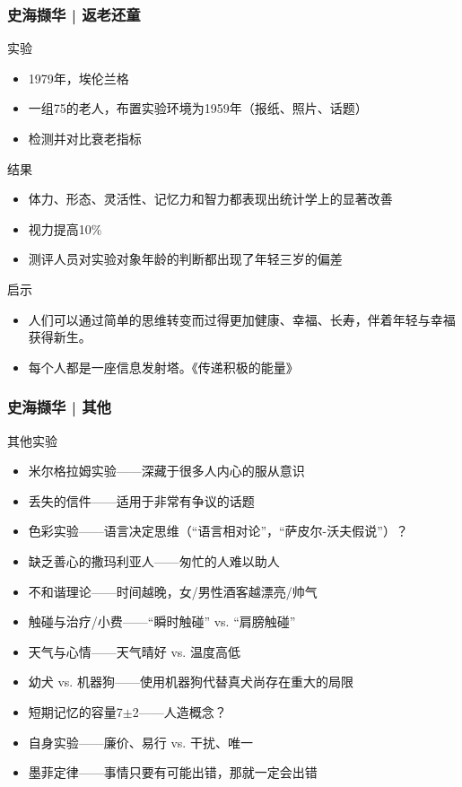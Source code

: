 \begin{frame}
  \frametitle{史海撷华 | 返老还童}
  \begin{block}{实验}
    \begin{itemize}
      \item 1979年，埃伦\textbullet 兰格
      \item 一组75的老人，布置实验环境为1959年（报纸、照片、话题）
      \item 检测并对比衰老指标
    \end{itemize}
  \end{block}
  \pause
  \begin{block}{结果}
    \begin{itemize}
      \item 体力、形态、灵活性、记忆力和智力都表现出统计学上的显著改善
      \item 视力提高10\%
      \item 测评人员对实验对象年龄的判断都出现了年轻三岁的偏差
    \end{itemize}
  \end{block}
  \pause
  \begin{block}{启示}
    \begin{itemize}
      \item 人们可以通过简单的思维转变而过得更加健康、幸福、长寿，伴着年轻与幸福获得新生。
      \item 每个人都是一座信息发射塔。《传递积极的能量》
    \end{itemize}
  \end{block}
\end{frame}

\begin{frame}
  \frametitle{史海撷华 | 其他}
  \begin{block}{其他实验}
    \begin{itemize}
      \item 米尔格拉姆实验——深藏于很多人内心的服从意识
      \item 丢失的信件——适用于非常有争议的话题
      \item 色彩实验——语言决定思维（“语言相对论”，“萨皮尔-沃夫假说”）？
      \item 缺乏善心的撒玛利亚人——匆忙的人难以助人
      \item 不和谐理论——时间越晚，女/男性酒客越漂亮/帅气
      \item 触碰与治疗/小费——“瞬时触碰” vs. “肩膀触碰”
      \item 天气与心情——天气晴好 vs. 温度高低
      \item 幼犬 vs. 机器狗——使用机器狗代替真犬尚存在重大的局限
      \item 短期记忆的容量7$\pm$2——人造概念？
      \item 自身实验——廉价、易行 vs. 干扰、唯一
      \item 墨菲定律——事情只要有可能出错，那就一定会出错
    \end{itemize}
  \end{block}
\end{frame}


